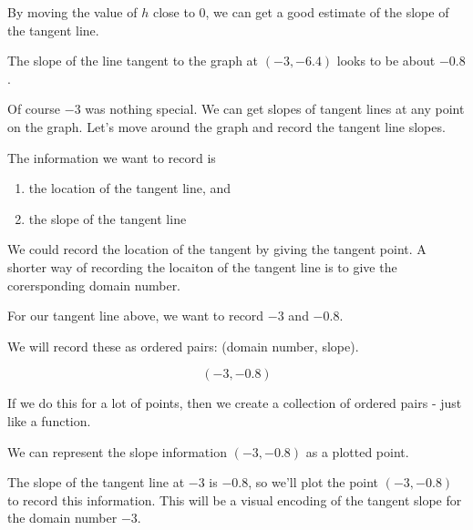 \documentclass{ximera}
\begin{document}
By moving the value of $h$ close to $0$, we can get a good estimate of the slope of the tangent line.









\begin{center}
\end{center}




The slope of the line tangent to the graph at $(-3, -6.4)$ looks to be about $-0.8$.

Of course $-3$ was nothing special.  We can get slopes of tangent lines at any point on the graph. Let's move around the graph and record the tangent line slopes.  

The information we want to record is 

\begin{enumerate}
\item the location of the tangent line, and
\item the slope of the tangent line 
\end{enumerate}

We could record the location of the tangent by giving the tangent point. A shorter way of recording the locaiton of the tangent line is to give the corersponding domain number.

For our tangent line above, we want to record $-3$ and $-0.8$.

We will record these as ordered pairs: (domain number, slope).

\[ (-3, -0.8)  \]


If we do this for a lot of points, then we create a collection of ordered pairs - just like a function.

We can represent the slope information $(-3, -0.8)$ as a plotted point.



The slope of the tangent line at $-3$ is $-0.8$, so we'll plot the point $(-3,-0.8)$ to record this information.  This will be a visual encoding of the tangent slope for the domain number $-3$.
\end{document}
